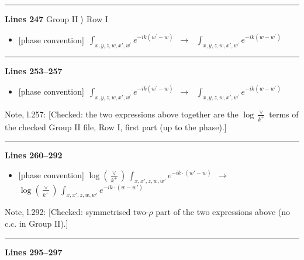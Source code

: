 \documentclass[10pt]{article}
\newenvironment{notebox}{\def\FrameCommand{{\color{notebar}\vrule width 1.5pt}\hspace{6pt}}\MakeFramed{\advance\hsize-\width\FrameRestore}\small}{\endMakeFramed}
\begin{document}
\noindent\rule{\linewidth}{0.3pt}\par\noindent\textbf{Lines 247} \quad \textsf{Group II $\rangle$ Row I} \par
\begin{itemize}[leftmargin=2.2em,itemsep=1pt,topsep=2pt]
\item[\textbf{l.247}] \textsf{\small [phase convention]} $\displaystyle \,\int_{x,y,z,w,x',w^{\prime}} e^{-ik(w^{\prime}-w)}$\ $\longrightarrow$\ $\displaystyle \,\int_{x,y,z,w,x',w^{\prime}} e^{-ik(w-w^{\prime})}$
\end{itemize}
\noindent\rule{\linewidth}{0.3pt}\par\noindent\textbf{Lines 253--257} \par
\begin{itemize}[leftmargin=2.2em,itemsep=1pt,topsep=2pt]
\item[\textbf{l.253}] \textsf{\small [phase convention]} $\displaystyle \,\int_{x,y,z,w,x',w^{\prime}} e^{-ik(w^{\prime}-w)}$\ $\longrightarrow$\ $\displaystyle \,\int_{x,y,z,w,x',w^{\prime}} e^{-ik(w-w^{\prime})}$
\end{itemize}
\begin{notebox}\textsf{\small Note, l.257:} [Checked: the two expressions above together are the $\log\frac{\vee}{k^{+}}$ terms of the checked Group II file, Row I, first part (up to the phase).]\end{notebox}
\noindent\rule{\linewidth}{0.3pt}\par\noindent\textbf{Lines 260--292} \par
\begin{itemize}[leftmargin=2.2em,itemsep=1pt,topsep=2pt]
\item[\textbf{l.260}] \textsf{\small [phase convention]} $\displaystyle \log{(\frac{\vee}{k^{+}})}\, \int_{x,x',z,w,w'}e^{-ik\cdot(w'-w)}$\ $\longrightarrow$\ $\displaystyle \log{(\frac{\vee}{k^{+}})}\, \int_{x,x',z,w,w'}e^{-ik\cdot(w-w')}$
\end{itemize}
\begin{notebox}\textsf{\small Note, l.292:} [Checked: symmetrised two-$\rho$ part of the two expressions above (no c.c. in Group II).]\end{notebox}
\noindent\rule{\linewidth}{0.3pt}\par\noindent\textbf{Lines 295--297} \par
\end{document}
